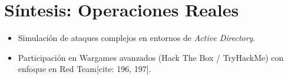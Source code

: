 \documentclass[11pt,a4paper]{report}
\begin{document}
	\section{Síntesis: Operaciones Reales}
	\begin{itemize}
		\item Simulación de ataques complejos en entornos de \textit{Active Directory}.
		\item Participación en Wargames avanzados (Hack The Box / TryHackMe) con enfoque en Red Team[cite: 196, 197].
	\end{itemize}
	
\end{document}
